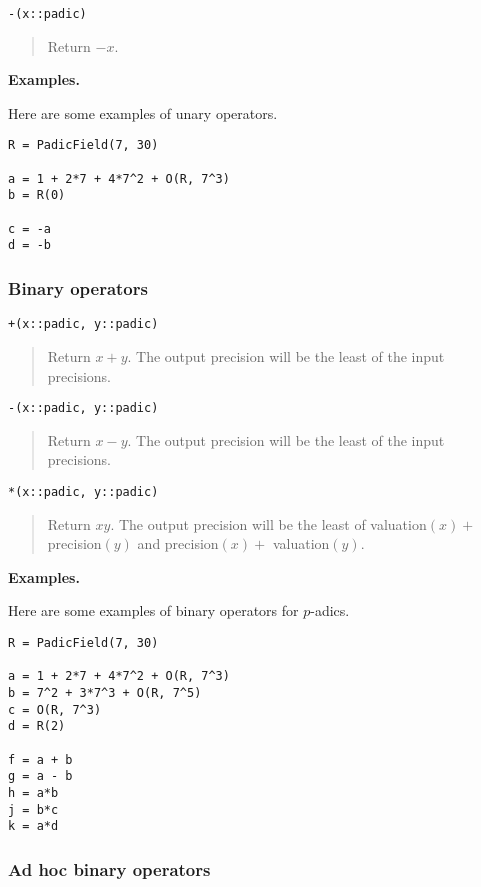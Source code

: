 \documentclass[a4paper,10pt]{article}
\newcommand{\desc}[1]{\vspace{-3mm}\begin{quote}#1\end{quote}}
\begin{document}
{{\begin{lstlisting}
-(x::padic)
\end{lstlisting}

\desc{Return $-x$.}

\textbf{Examples.}

Here are some examples of unary operators.

\begin{lstlisting}
R = PadicField(7, 30)

a = 1 + 2*7 + 4*7^2 + O(R, 7^3)
b = R(0)

c = -a
d = -b
\end{lstlisting}

\subsubsection{Binary operators}

\begin{lstlisting}
+(x::padic, y::padic)
\end{lstlisting}

\desc{Return $x + y$. The output precision will be the least of the input
precisions.}

\begin{lstlisting}
-(x::padic, y::padic)
\end{lstlisting}

\desc{Return $x - y$. The output precision will be the least of the input
precisions.}

\begin{lstlisting}
*(x::padic, y::padic)
\end{lstlisting}

\desc{Return $xy$. The output precision will be the least of valuation$(x) +$
precision$(y)$ and precision$(x) +$ valuation$(y)$.}

\textbf{Examples.}

Here are some examples of binary operators for $p$-adics.

\begin{lstlisting}
R = PadicField(7, 30)

a = 1 + 2*7 + 4*7^2 + O(R, 7^3)
b = 7^2 + 3*7^3 + O(R, 7^5)
c = O(R, 7^3)
d = R(2)

f = a + b
g = a - b
h = a*b
j = b*c
k = a*d
\end{lstlisting}

\subsubsection{Ad hoc binary operators}

}}
\end{document}
